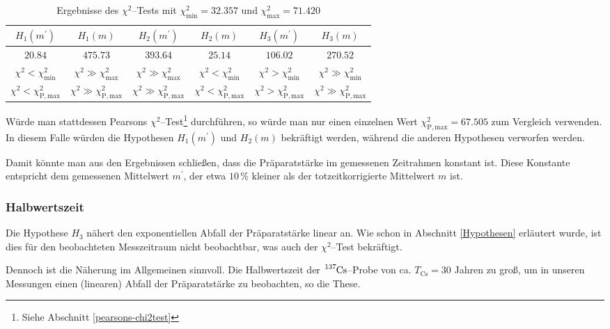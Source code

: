 \documentclass[12pt,a4paper]{scrartcl}
\numberwithin{equation}{section} %
\begin{document}
\begin{table}[h]
	\centering
	\begin{tabular}{c|c|c|c|c|c}
		$H_1(m^\prime)$
			& $H_1(m)$
			& $H_2(m^\prime)$
			& $H_2(m)$
			& $H_3(m^\prime)$
			& $H_3(m)$
			\\
		\hline
		$20.84$
			& $475.73$
			& $393.64$
			& $25.14$
			& $106.02$
			& $270.52$
			\\
		$\chi^2 < \chi^2_\mathrm{min}$
			& $\chi^2 \gg \chi^2_\mathrm{max}$
			& $\chi^2 \gg \chi^2_\mathrm{max}$
			& $\chi^2 < \chi^2_\mathrm{min}$
			& $\chi^2 > \chi^2_\mathrm{min}$
			& $\chi^2 \gg \chi^2_\mathrm{min}$
			\\
		$\chi^2 < \chi_\mathrm{P, max}^2$
			& $\chi^2 \gg \chi_\mathrm{P, max}^2$
			& $\chi^2 \gg \chi_\mathrm{P, max}^2$
			& $\chi^2 < \chi_\mathrm{P, max}^2$
			& $\chi^2 > \chi_\mathrm{P, max}^2$
			& $\chi^2 \gg \chi_\mathrm{P, max}^2$
	\end{tabular}
	\caption{Ergebnisse des $\chi^2$--Tests mit $\chi^2_\mathrm{min} = 32.357$ und $\chi^2_\mathrm{max} = 71.420$ \cite{Kapur}}
	\label{tab:ChiSquared}
\end{table}

\noindent
Würde man stattdessen Pearsons $\chi^2$--Test\footnote{Siehe Abschnitt \ref{pearsons-chi2test}} durchführen, so würde man nur einen einzelnen Wert $\chi_\mathrm{P, max}^2 = 67.505$ zum Vergleich verwenden. \cite{Kapur} In diesem Falle würden die Hypothesen $H_1(m^\prime)$ und $H_2(m)$ bekräftigt werden, während die anderen Hypothesen verworfen werden.

Damit könnte man aus den Ergebnissen schließen, dass die Präparatstärke im gemessenen Zeitrahmen konstant ist. Diese Konstante entspricht dem gemessenen Mittelwert $m^\prime$, der etwa $10\,\%$ kleiner als der totzeitkorrigierte Mittelwert $m$ ist.

\hypertarget{totzeit}{\subsubsection{Halbwertszeit}\label{totzeit}}
Die Hypothese $H_3$ nähert den exponentiellen Abfall der Präparatstärke linear an. Wie schon in Abschnitt \ref{Hypothesen} erläutert wurde, ist dies für den beobachteten Messzeitraum nicht beobachtbar, was auch der $\chi^2$--Test bekräftigt.

Dennoch ist die Näherung im Allgemeinen sinnvoll. Die Halbwertszeit der $\ce{^{137}Cs}$--Probe von ca. $T_\mathrm{Cs}=30$ Jahren \cite{Chart of Nuclides}  zu groß, um in unseren Messungen einen (linearen) Abfall der Präparatstärke zu beobachten, so die These.
\end{document}
